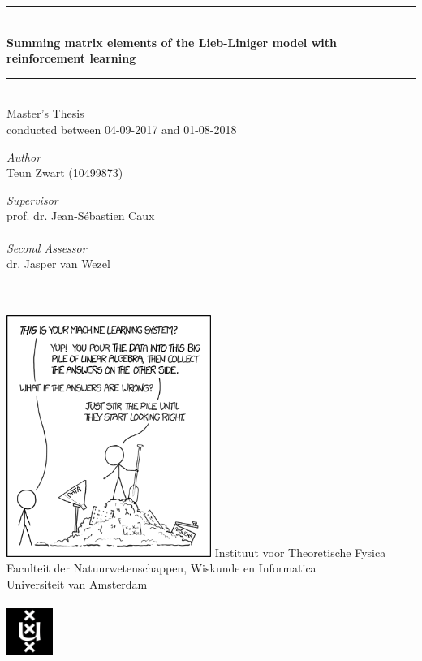 \documentclass[11pt, a4paper]{report} %
\begin{document}
\begin{titlepage}
	\begin{center}
		\rule{\textwidth}{0.4mm}\\[0.5cm]
		\huge{\textbf{Summing matrix elements of the Lieb-Liniger model with reinforcement learning\\}}
		\rule{\textwidth}{0.4mm}\\[0.5cm]
		\large{Master's Thesis\\conducted between 04-09-2017 and 01-08-2018}\\[0.5cm]
		\begin{minipage}[t]{0.4\textwidth}
			\begin{flushleft}
				\large\emph{Author}\\{Teun Zwart (10499873)}
			\end{flushleft}
		\end{minipage}
		\begin{minipage}[t]{0.4\textwidth}
			\begin{flushright}
				\large\emph{Supervisor}\\{prof. dr. Jean-Sébastien Caux}\\~\\
				\large\emph{Second Assessor}\\{dr. Jasper van Wezel}\\~\\~\\
			\end{flushright}
		\end{minipage}
		\includegraphics[width=0.5\textwidth]{machine_learning_2x.png}
		\vfill
		\large{Instituut voor Theoretische Fysica}\\
		\large{Faculteit der Natuurwetenschappen, Wiskunde en Informatica}\\
		\large{Universiteit van Amsterdam}\\~\\
		\includegraphics[width=1.5cm]{UvA-logo.png}
	\end{center}
\end{titlepage}
\end{document}
